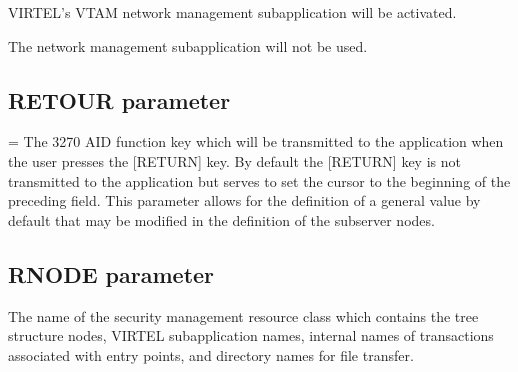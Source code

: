 \documentclass[letterpaper,10pt,english]{sphinxmanual}
\begin{document}
\sphinxAtStartPar
{} \sphinxhyphen{} VIRTEL’s VTAM network management sub\sphinxhyphen{}application will be activated.

\sphinxAtStartPar
{} \sphinxhyphen{} The network management sub\sphinxhyphen{}application will not be used.

\ignorespaces 

\subsection{RETOUR parameter}
\label{\detokenize{Installation_Guide:retour-parameter}}\label{\detokenize{Installation_Guide:index-110}}
\begin{sphinxVerbatim}[commandchars=\\\{\}]
 
\end{sphinxVerbatim}

\sphinxAtStartPar
{} = The 3270 AID function key which will be transmitted to the application when the user presses the {[}RETURN{]} key. By default the {[}RETURN{]} key is not transmitted to the application but serves to set the cursor to the beginning of the preceding field. This parameter allows for the definition of a general value by default that may be modified in the definition of the sub\sphinxhyphen{}server nodes.

\ignorespaces 

\subsection{RNODE parameter}
\label{\detokenize{Installation_Guide:rnode-parameter}}\label{\detokenize{Installation_Guide:index-111}}
\begin{sphinxVerbatim}[commandchars=\\\{\}]
 
\end{sphinxVerbatim}

\sphinxAtStartPar
{} \sphinxhyphen{} The name of the security management resource class which contains the tree structure nodes, VIRTEL subapplication names, internal names of transactions associated with entry points, and directory names for file transfer.
\end{document}
